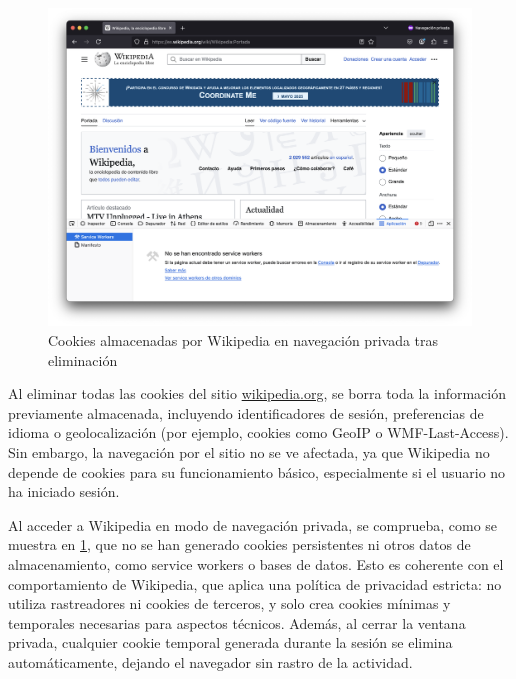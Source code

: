 \begin{figure}[H]
    \centering
    \includegraphics[width=\textwidth]{cookies_wiki_npriv.png}
    \caption{Cookies almacenadas por Wikipedia en navegación privada tras eliminación}
    \label{fig:cookies_wiki_npriv}
\end{figure}

Al eliminar todas las cookies del sitio \url{wikipedia.org}, se borra toda la información previamente almacenada, incluyendo identificadores de sesión, preferencias de idioma o geolocalización (por ejemplo, cookies como GeoIP o WMF-Last-Access). Sin embargo, la navegación por el sitio no se ve afectada, ya que Wikipedia no depende de cookies para su funcionamiento básico, especialmente si el usuario no ha iniciado sesión.

Al acceder a Wikipedia en modo de navegación privada, se comprueba, como se muestra en \ref{fig:cookies_wiki_npriv}, que no se han generado cookies persistentes ni otros datos de almacenamiento, como service workers o bases de datos. Esto es coherente con el comportamiento de Wikipedia, que aplica una política de privacidad estricta: no utiliza rastreadores ni cookies de terceros, y solo crea cookies mínimas y temporales necesarias para aspectos técnicos. Además, al cerrar la ventana privada, cualquier cookie temporal generada durante la sesión se elimina automáticamente, dejando el navegador sin rastro de la actividad.

